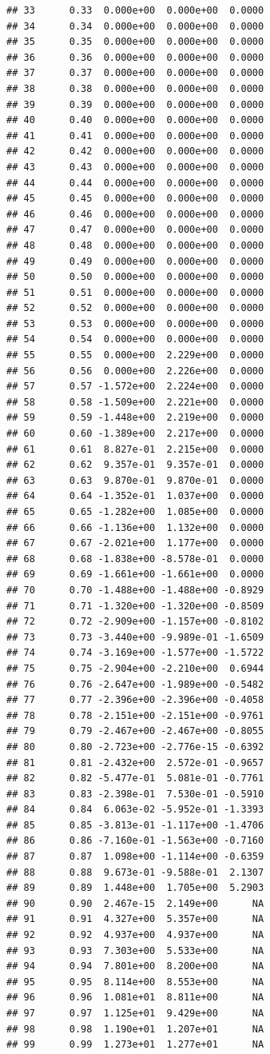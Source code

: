 \documentclass{article}\usepackage[]{graphicx}\usepackage[]{color}
\makeatletter
\newenvironment{kframe}{%
 \def\at@end@of@kframe{}%
 \ifinner\ifhmode%
  \def\at@end@of@kframe{\end{minipage}}%
  \begin{minipage}{\columnwidth}%
 \fi\fi%
 \def\FrameCommand##1{\hskip\@totalleftmargin \hskip-\fboxsep
 \colorbox{shadecolor}{##1}\hskip-\fboxsep
     \hskip-\linewidth \hskip-\@totalleftmargin \hskip\columnwidth}%
 \MakeFramed {\advance\hsize-\width
   \@totalleftmargin\z@ \linewidth\hsize
   \@setminipage}}%
 {\par\unskip\endMakeFramed%
 \at@end@of@kframe}
\newenvironment{knitrout}{}{} %
\makeatother
\begin{document}
\begin{knitrout}
\begin{kframe}
\begin{verbatim}
## 33      0.33  0.000e+00  0.000e+00  0.0000
## 34      0.34  0.000e+00  0.000e+00  0.0000
## 35      0.35  0.000e+00  0.000e+00  0.0000
## 36      0.36  0.000e+00  0.000e+00  0.0000
## 37      0.37  0.000e+00  0.000e+00  0.0000
## 38      0.38  0.000e+00  0.000e+00  0.0000
## 39      0.39  0.000e+00  0.000e+00  0.0000
## 40      0.40  0.000e+00  0.000e+00  0.0000
## 41      0.41  0.000e+00  0.000e+00  0.0000
## 42      0.42  0.000e+00  0.000e+00  0.0000
## 43      0.43  0.000e+00  0.000e+00  0.0000
## 44      0.44  0.000e+00  0.000e+00  0.0000
## 45      0.45  0.000e+00  0.000e+00  0.0000
## 46      0.46  0.000e+00  0.000e+00  0.0000
## 47      0.47  0.000e+00  0.000e+00  0.0000
## 48      0.48  0.000e+00  0.000e+00  0.0000
## 49      0.49  0.000e+00  0.000e+00  0.0000
## 50      0.50  0.000e+00  0.000e+00  0.0000
## 51      0.51  0.000e+00  0.000e+00  0.0000
## 52      0.52  0.000e+00  0.000e+00  0.0000
## 53      0.53  0.000e+00  0.000e+00  0.0000
## 54      0.54  0.000e+00  0.000e+00  0.0000
## 55      0.55  0.000e+00  2.229e+00  0.0000
## 56      0.56  0.000e+00  2.226e+00  0.0000
## 57      0.57 -1.572e+00  2.224e+00  0.0000
## 58      0.58 -1.509e+00  2.221e+00  0.0000
## 59      0.59 -1.448e+00  2.219e+00  0.0000
## 60      0.60 -1.389e+00  2.217e+00  0.0000
## 61      0.61  8.827e-01  2.215e+00  0.0000
## 62      0.62  9.357e-01  9.357e-01  0.0000
## 63      0.63  9.870e-01  9.870e-01  0.0000
## 64      0.64 -1.352e-01  1.037e+00  0.0000
## 65      0.65 -1.282e+00  1.085e+00  0.0000
## 66      0.66 -1.136e+00  1.132e+00  0.0000
## 67      0.67 -2.021e+00  1.177e+00  0.0000
## 68      0.68 -1.838e+00 -8.578e-01  0.0000
## 69      0.69 -1.661e+00 -1.661e+00  0.0000
## 70      0.70 -1.488e+00 -1.488e+00 -0.8929
## 71      0.71 -1.320e+00 -1.320e+00 -0.8509
## 72      0.72 -2.909e+00 -1.157e+00 -0.8102
## 73      0.73 -3.440e+00 -9.989e-01 -1.6509
## 74      0.74 -3.169e+00 -1.577e+00 -1.5722
## 75      0.75 -2.904e+00 -2.210e+00  0.6944
## 76      0.76 -2.647e+00 -1.989e+00 -0.5482
## 77      0.77 -2.396e+00 -2.396e+00 -0.4058
## 78      0.78 -2.151e+00 -2.151e+00 -0.9761
## 79      0.79 -2.467e+00 -2.467e+00 -0.8055
## 80      0.80 -2.723e+00 -2.776e-15 -0.6392
## 81      0.81 -2.432e+00  2.572e-01 -0.9657
## 82      0.82 -5.477e-01  5.081e-01 -0.7761
## 83      0.83 -2.398e-01  7.530e-01 -0.5910
## 84      0.84  6.063e-02 -5.952e-01 -1.3393
## 85      0.85 -3.813e-01 -1.117e+00 -1.4706
## 86      0.86 -7.160e-01 -1.563e+00 -0.7160
## 87      0.87  1.098e+00 -1.114e+00 -0.6359
## 88      0.88  9.673e-01 -9.588e-01  2.1307
## 89      0.89  1.448e+00  1.705e+00  5.2903
## 90      0.90  2.467e-15  2.149e+00      NA
## 91      0.91  4.327e+00  5.357e+00      NA
## 92      0.92  4.937e+00  4.937e+00      NA
## 93      0.93  7.303e+00  5.533e+00      NA
## 94      0.94  7.801e+00  8.200e+00      NA
## 95      0.95  8.114e+00  8.553e+00      NA
## 96      0.96  1.081e+01  8.811e+00      NA
## 97      0.97  1.125e+01  9.429e+00      NA
## 98      0.98  1.190e+01  1.207e+01      NA
## 99      0.99  1.273e+01  1.277e+01      NA
\end{verbatim}
\end{kframe}
\end{knitrout}
\end{document}
